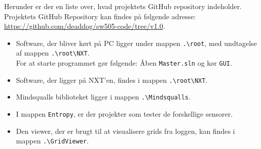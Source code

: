 Herunder er der en liste over, hvad projektets GitHub repository indeholder.
Projektets GitHub Repository kan findes på følgende adresse: \url{https://github.com/deaddog/sw505-code/tree/v1.0}.

\begin{itemize}
\item Software, der bliver kørt på PC ligger under mappen \lstinline[style=c]!.\root!, med undtagelse af mappen \lstinline[style=c]!.\root\NXT!.
\\
For at starte programmet gør følgende:
Åben \lstinline[style=c]!Master.sln! og kør \lstinline[style=c]!GUI!.
\item Software, der ligger på NXT'en, findes i mappen \lstinline[style=c]!.\root\NXT!.
\item Mindsqualls biblioteket ligger i mappen \lstinline[style=c]!.\Mindsqualls!.
\item I mappen \lstinline[style=c]!Entropy!, er der projekter som tester de forskellige sensorer.
\item Den viewer, der er brugt til at visualisere grids fra loggen, kan findes i mappen \lstinline[style=c]!.\GridViewer!.

\end{itemize}